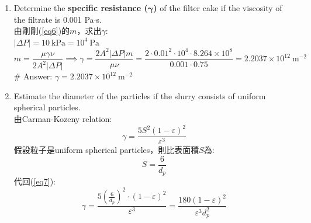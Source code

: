 \documentclass[12pt,a4paper]{article}
\begin{document}
\begin{problems}
\begin{enumerate}
\begin{align}
      \implies&
      m = \frac{\frac{120}{3.3\times10^{-4}} - \frac{60}{2.2\times10^{-4}}}{3.3\times10^{-4} - 2.2\times10^{-4}} = 8.264\times10^8~\text{s/m}^6
    \end{align}
    代回(\ref{eq4})的第一式，解出$b$:
    \begin{equation}
      \frac{60}{2.2\times10^{-4}} = (8.264\times10^8)(2.2\times10^{-4}) + b \implies b = 9.0919\times10^4~\text{s/m}^3
    \end{equation}
    代入(\ref{eq5}):\\
    100 cm$^2$ = 0.01 m$^2$
    \begin{equation}
      L = \frac{9.0919\times10^4}{8.264\times10^8}\cdot \frac{0.75}{2\cdot 0.01} = 4.12568\times 10^{-3}~\text{m}
    \end{equation}
    \# Answer: \underline{$L=4.126\times10^{-3}~\text{m}=4.126~\text{mm}$}
    \item Determine the \textbf{specific resistance ($\boldsymbol{\gamma}$)} of the filter cake if the viscosity of the filtrate is 0.001 Pa$\cdot$s.\\
    由剛剛(\ref{eq6})的$m$，求出$\gamma$:\\
    $\left|\Delta P\right|=10~\text{kPa}=10^4~\text{Pa}$
    \begin{equation}
      m = \frac{\mu\gamma\nu}{2A^2\left|\Delta P\right|} \implies \gamma = \frac{2A^2\left|\Delta P\right|m}{\mu\nu} = 
      \frac{2\cdot 0.01^2\cdot 10^4\cdot 8.264\times10^8}{0.001\cdot 0.75} = 2.2037\times10^{12}~\text{m}^{-2}
    \end{equation}
    \# Answer: \underline{$\gamma=2.2037\times10^{12}~\text{m}^{-2}$}
    \item Estimate the diameter of the particles if the slurry consists of uniform spherical particles.\\
    由Carman-Kozeny relation:
    \begin{equation}
      \gamma = \frac{5S^2\left(1-\varepsilon\right)^2}{\varepsilon^3} \label{eq7}
    \end{equation}
    假設粒子是uniform spherical particles，則比表面積$S$為:
    \begin{equation}
      S = \frac{6}{d_p}
    \end{equation}
    代回(\ref{eq7}):
    \begin{equation}
      \gamma = \frac{5\left(\frac{6}{d_p}\right)^2\cdot\left(1-\varepsilon\right)^2}{\varepsilon^3} = \frac{180\left(1-\varepsilon\right)^2}{\varepsilon^3 d_p^2}
    \end{equation}

\end{enumerate}
\end{problems}
\end{document}
